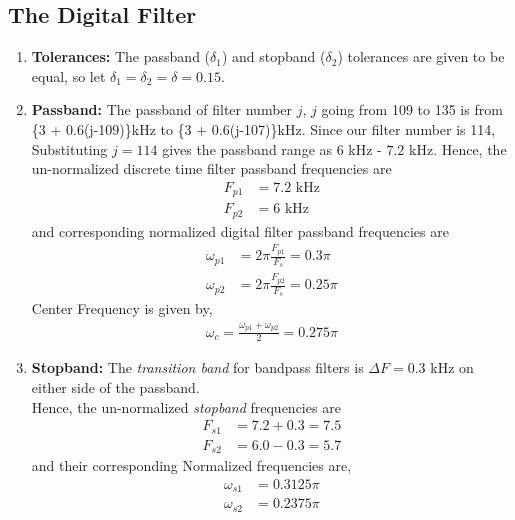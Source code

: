 \documentclass[journal,12pt,twocolumn]{IEEEtran}
\begin{document}
\subsection{The Digital Filter}
\begin{enumerate}
\item {\textbf{Tolerances:}}  The passband ($\delta_1$) and stopband ($\delta_2$) tolerances are given to
be equal, so let $\delta_1 = \delta_2 = \delta = 0.15$.
\item {\textbf{Passband:}}  The passband of filter number $j$, $j$ going from 109 to 135 is from \{3 + 0.6(j-109)\}kHz
to \{3 + 0.6(j-107)\}kHz.  Since our filter number is 114, Substituting $j = 114$ gives the passband
range as $6$ kHz - $7.2$ kHz.  Hence, the un-normalized discrete time filter
passband frequencies are
\begin{align}
    F_{p1} &= 7.2 \text{ kHz}\\
    F_{p2} &= 6 \text{ kHz}
\end{align}
and corresponding normalized digital filter passband frequencies are
\begin{align}
    \omega_{p1} &= 2\pi\frac{F_{p1}}{F_s} =0.3\pi \\
    \omega_{p2} &= 2\pi\frac{F_{p2}}{F_s}  = 0.25 \pi
\end{align}
Center Frequency is given by,
\begin{align}
    \omega_c = \frac{\omega_{p1} + \omega_{p2}}{2} = 0.275\pi
\end{align}
\item {\textbf{Stopband:}}  The {\em transition band} for bandpass filters is $\Delta F = 0.3$ kHz on either side of the passband.\\
Hence, the un-normalized {\em stopband} frequencies are 
\begin{align}
    F_{s1} &= 7.2 + 0.3 = 7.5\\
    F_{s2} &= 6.0 - 0.3 = 5.7
\end{align}
and their corresponding Normalized frequencies are,
\begin{align}
    \omega_{s1} &= 0.3125 \pi\\
    \omega_{s2} &=  0.2375 \pi
\end{align}
\end{enumerate}
\end{document}
